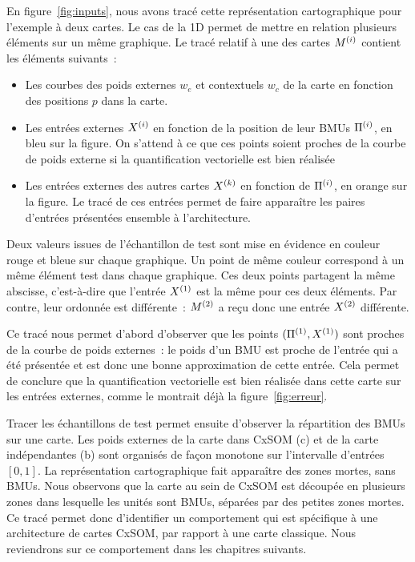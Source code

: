 \documentclass[../main]{subfiles}
\begin{document}
En figure~\ref{fig:inputs}, nous avons tracé cette représentation cartographique pour l'exemple à deux cartes. Le cas de la 1D permet de mettre en relation plusieurs éléments sur un même graphique.
Le tracé relatif à une des cartes $M^{({i})}$ contient les éléments suivants~:
\begin{itemize}
    \item Les courbes des poids externes $w_e$ et contextuels $w_c$ de la carte en fonction des positions $p$ dans la carte.
    \item Les entrées externes $X^{({i})}$ en fonction de la position de leur BMUs $\Pi^{({i})}$, en bleu sur la figure. On s'attend à ce que ces points soient proches de la courbe de poids externe si la quantification vectorielle est bien réalisée
    \item Les entrées externes des autres cartes $X^{({k})}$ en fonction de $\Pi^{({i})}$, en orange sur la figure. Le tracé de ces entrées permet de faire apparaître les paires d'entrées présentées ensemble à l'architecture.
\end{itemize} 

Deux valeurs issues de l'échantillon de test sont mise en évidence en couleur rouge et bleue sur chaque graphique. Un point de même couleur correspond à un même élément test dans chaque graphique. Ces deux points partagent la même abscisse, c'est-à-dire que l'entrée $X^{({1})}$ est la même pour ces deux éléments. Par contre, leur ordonnée est différente~: $M^{({2})}$ a reçu donc une entrée $X^{({2})}$ différente.

Ce tracé nous permet d'abord d'observer que les points $(\Pi^{({1})},X^{({1})})$ sont proches de la courbe de poids externes~: le poids d'un BMU est proche de l'entrée qui a été présentée et est donc une bonne approximation de cette entrée. Cela permet de conclure que la quantification vectorielle est bien réalisée dans cette carte sur les entrées externes, comme le montrait déjà la figure~\ref{fig:erreur}.

Tracer les échantillons de test permet ensuite d'observer la répartition des BMUs sur une carte. 
Les poids externes de la carte dans CxSOM (c) et de la carte indépendantes (b) sont organisés de façon monotone sur l'intervalle d'entrées $[0,1]$.
La représentation cartographique fait apparaître des zones mortes, sans BMUs. 
Nous observons que la carte au sein de CxSOM est découpée en plusieurs zones dans lesquelle les unités sont BMUs, séparées par des petites zones mortes. Ce tracé permet donc d'identifier un comportement qui est spécifique à une architecture de cartes CxSOM, par rapport à une carte classique. Nous reviendrons sur ce comportement dans les chapitres suivants.
\end{document}

